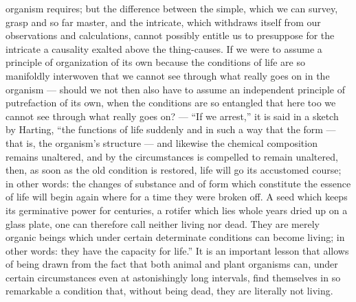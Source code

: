 \documentclass[12pt,a4paper]{book}
\begin{document}
organism requires; but the difference between the simple, which we can survey,
grasp and so far master, and the intricate, which withdraws itself from our
observations and calculations, cannot possibly entitle us to presuppose for the
intricate a causality exalted above the thing-causes. If we were to assume a
principle of organization of its own because the conditions of life are so
manifoldly interwoven that we cannot see through what really goes on in the
organism --- should we not then also have to assume an independent principle of
putrefaction of its own, when the conditions are so entangled that here too we
cannot see through what really goes on? --- ``If we arrest,'' it is said in a
sketch by Harting, ``the functions of life suddenly and in such a way that the
form --- that is, the organism's structure --- and likewise the chemical
composition remains unaltered, and by the circumstances is compelled to remain
unaltered, then, as soon as the old condition is restored, life will go its
accustomed course; in other words: the changes of substance and of form which
constitute the essence of life will begin again where for a time they were
broken off. A seed which keeps its germinative power for centuries, a rotifer
which lies whole years dried up on a glass plate, one can therefore call
neither living nor dead. They are merely organic beings which under certain
determinate conditions can become living; in other words: they have the
capacity for life.'' It is an important lesson that allows of being drawn from
the fact that both animal and plant organisms can, under certain circumstances
even at astonishingly long intervals, find themselves in so remarkable a
condition that, without being dead, they are literally not living.
\end{document}
